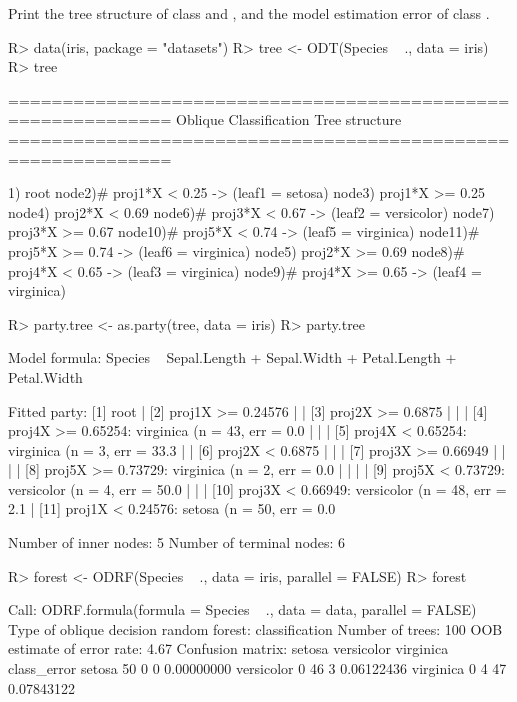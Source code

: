 \documentclass[nojss]{jss}
\numberwithin{equation}{section}
\begin{document}
%
Print the tree structure of class  and , and the model estimation error of class .
%
\begin{Schunk}
\begin{Sinput}
R> data(iris, package = "datasets")
R> tree <- ODT(Species ~ ., data = iris)
R> tree
\end{Sinput}
\begin{Soutput}
============================================================= 
Oblique Classification Tree structure 
=============================================================

1) root
   node2)# proj1*X < 0.25 -> (leaf1 = setosa)
   node3)  proj1*X >= 0.25
      node4)  proj2*X < 0.69
         node6)# proj3*X < 0.67 -> (leaf2 = versicolor)
         node7)  proj3*X >= 0.67
            node10)# proj5*X < 0.74 -> (leaf5 = virginica)
            node11)# proj5*X >= 0.74 -> (leaf6 = virginica)
      node5)  proj2*X >= 0.69
         node8)# proj4*X < 0.65 -> (leaf3 = virginica)
         node9)# proj4*X >= 0.65 -> (leaf4 = virginica)
\end{Soutput}
\begin{Sinput}
R> party.tree <- as.party(tree, data = iris)
R> party.tree
\end{Sinput}
\begin{Soutput}
Model formula:
Species ~ Sepal.Length + Sepal.Width + Petal.Length + Petal.Width

Fitted party:
[1] root
|   [2] proj1X >= 0.24576
|   |   [3] proj2X >= 0.6875
|   |   |   [4] proj4X >= 0.65254: virginica (n = 43, err = 0.0%
|   |   |   [5] proj4X < 0.65254: virginica (n = 3, err = 33.3%
|   |   [6] proj2X < 0.6875
|   |   |   [7] proj3X >= 0.66949
|   |   |   |   [8] proj5X >= 0.73729: virginica (n = 2, err = 0.0%
|   |   |   |   [9] proj5X < 0.73729: versicolor (n = 4, err = 50.0%
|   |   |   [10] proj3X < 0.66949: versicolor (n = 48, err = 2.1%
|   [11] proj1X < 0.24576: setosa (n = 50, err = 0.0%

Number of inner nodes:    5
Number of terminal nodes: 6
\end{Soutput}
\begin{Sinput}
R> forest <- ODRF(Species ~ ., data = iris, parallel = FALSE)
R> forest
\end{Sinput}
\begin{Soutput}
Call:
 ODRF.formula(formula = Species ~ ., data = data, parallel = FALSE) 
               Type of oblique decision random forest: classification
                                      Number of trees: 100
                           OOB estimate of error rate: 4.67%
Confusion matrix:
           setosa versicolor virginica class_error
setosa         50          0         0  0.00000000
versicolor      0         46         3  0.06122436
virginica       0          4        47  0.07843122
\end{Soutput}
\end{Schunk}
\end{document}
